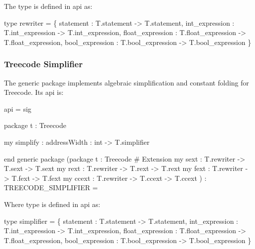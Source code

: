 The type  is defined in api
 as:
\begin{SML}
   type rewriter = 
       \{ statement   : T.statement -> T.statement,
         int_expression  : T.int_expression -> T.int_expression,
         float_expression  : T.float_expression -> T.float_expression,
         bool_expression : T.bool_expression -> T.bool_expression
       \} 
\end{SML}
 
\subsubsection{Treecode Simplifier}

The generic package 
implements algebraic simplification and constant folding for Treecode.
Its api is:
\begin{SML}
api  =
sig

   package t : Treecode

   my simplify  :
       { addressWidth : int } -> T.simplifier
   
end
generic package 
  (package t : Treecode
   #  Extension 
   my sext : T.rewriter -> T.sext -> T.sext
   my rext : T.rewriter -> T.rext -> T.rext
   my fext : T.rewriter -> T.fext -> T.fext
   my ccext : T.rewriter -> T.ccext -> T.ccext
  ) : TREECODE_SIMPLIFIER =
\end{SML}

Where type  is defined in api 
 as:
\begin{SML}
   type simplifier =
       \{ statement   : T.statement -> T.statement,
         int_expression  : T.int_expression -> T.int_expression,
         float_expression  : T.float_expression -> T.float_expression,
         bool_expression : T.bool_expression -> T.bool_expression
       \}
\end{SML}


